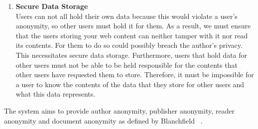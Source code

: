\begin{enumerate}
    \item{\textbf{Secure Data Storage} \\
Users can not all hold their own data because this would violate a user’s anonymity,
so other users must hold it for them. As a result, we must ensure that the users storing
your web content can neither tamper with it nor read its contents. For them to do so could
possibly breach the author’s privacy. This necessitates secure data storage.
Furthermore, users that hold data for other users must not be able to be held responsible
for the contents that other users have requested them to store. Therefore, it must be
impossible for a user to know the contents of the data that they store for other users
and what this data represents.
        }
\end{enumerate}

The system aims to provide author anonymity, publisher anonymity,
reader anonymity and document anonymity as defined by Blanchfield ~\cite{blanchfield}.
